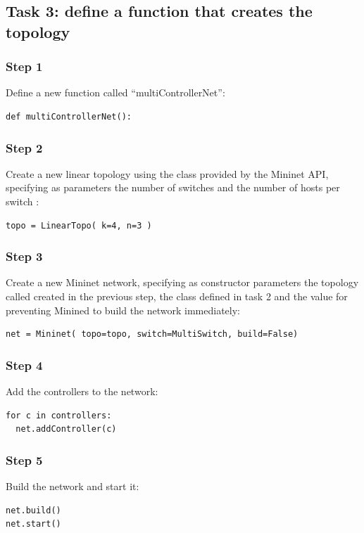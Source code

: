 \subsection*{Task 3: define a function that creates the topology}
\subsubsection*{Step 1}
Define a new function called ``multiControllerNet'':
\begin{lstlisting}
def multiControllerNet():
\end{lstlisting}

\subsubsection*{Step 2}
Create a new linear topology using the class  provided by
the Mininet API, specifying as parameters the number of switches  and the
number of hosts per switch :
\begin{lstlisting}
topo = LinearTopo( k=4, n=3 )
\end{lstlisting}

\subsubsection*{Step 3}
Create a new Mininet network, specifying as constructor parameters the topology
called  created in the previous step, the class 
defined in task 2 and the value  for preventing Minined to build
the network immediately:
\begin{lstlisting}
net = Mininet( topo=topo, switch=MultiSwitch, build=False)
\end{lstlisting}

\subsubsection*{Step 4}
Add the controllers to the network:
\begin{lstlisting}
for c in controllers:
  net.addController(c)
\end{lstlisting}

\subsubsection*{Step 5}
Build the network and start it:
\begin{lstlisting}
net.build()
net.start()
\end{lstlisting}


